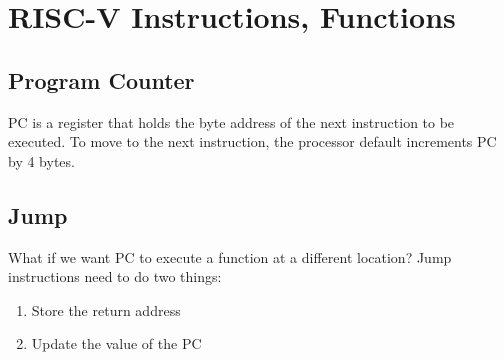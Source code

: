 \chapter{RISC-V Instructions, Functions}
\section{Program Counter}
PC is a register that holds the byte address of the next instruction to be executed. To move to the next instruction, the processor default increments PC by 4 bytes.

\section{Jump}
What if we want PC to execute a function at a different location? Jump instructions need to do two things:
\begin{enumerate}
    \item Store the return address
    \item Update the value of the PC
\end{enumerate}

